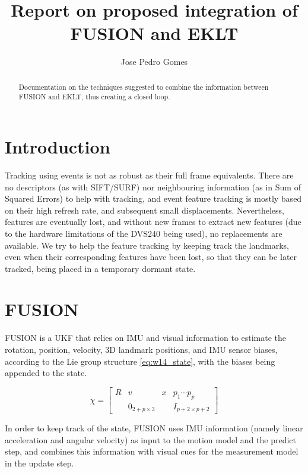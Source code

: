 \documentclass[10pt,twocolumn]{IEEEtran}
\begin{document}
\title{Report on proposed integration of FUSION and EKLT}
\author{Jose Pedro Gomes}

\maketitle

\begin{abstract}
    Documentation on the techniques suggested to combine the information between FUSION and EKLT, thus creating a closed loop.
\end{abstract}

\section{Introduction}

Tracking using events is not as robust as their full frame equivalents. There are no descriptors (as with SIFT/SURF) nor neighbouring information (as in Sum of Squared Errors) to help with tracking, and event feature tracking is mostly based on their high refresh rate, and subsequent small displacements. Nevertheless, features are eventually lost, and without new frames to extract new features (due to the hardware limitations of the DVS240 being used), no replacements are available. We try to help the feature tracking by keeping track the landmarks, even when their corresponding features have been lost, so that they can be later tracked, being placed in a temporary dormant state.

\section{FUSION}

FUSION is a UKF that relies on IMU and visual information to estimate the rotation, position, velocity, 3D landmark positions, and IMU sensor biases, according to the Lie group structure \eqref{eq:w14_state}, with the biases being appended to the state.

\begin{equation}
    \label{eq:w14_state}
    \chi = \begin{bmatrix}
        R & v & x & p_1 \cdots p_p \\ 
         &0_{2+p\times 3}   &&I_{p+2\times p+2}
        \end{bmatrix}
\end{equation}

In order to keep track of the state, FUSION uses IMU information (namely linear acceleration and angular velocity) as input to the motion model and the predict step, and combines this information with visual cues for the measurement model in the update step.
\end{document}
